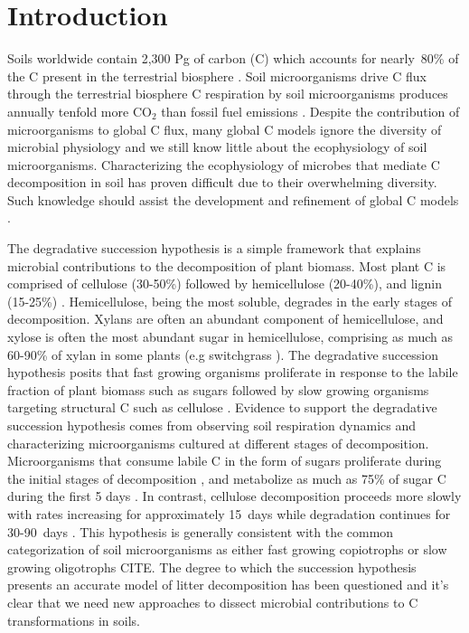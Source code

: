 \section{Introduction}
Soils worldwide contain 2,300 Pg of carbon (C) which accounts for nearly~80\%
of the C present in the terrestrial biosphere
\citep{Amundson_2001,BATJES_1996}. Soil microorganisms drive C flux through the
terrestrial biosphere C respiration by soil microorganisms
produces annually tenfold more CO$_{2}$ than fossil fuel emissions
\citep{chapin2002principles}. Despite the contribution of microorganisms to
global C flux, many global C models ignore the diversity of microbial
physiology \citep{Allison2010,Six2006,Treseder2011} and we still know little
about the ecophysiology of soil microorganisms. Characterizing the
ecophysiology of microbes that mediate C decomposition in soil has proven
difficult due to their overwhelming diversity. Such knowledge should assist
the development and refinement of global C models
\citep{Bradford2008,Neff_2001,McGuire2010,Wieder2013}.

The degradative succession hypothesis is a simple framework that explains
microbial contributions to the decomposition of plant biomass.  Most plant C is
comprised of cellulose (30-50\%) followed by hemicellulose
(20-40\%), and lignin (15-25\%) \citep{Lynd2002}. Hemicellulose, being the most
soluble, degrades in the early stages of decomposition. Xylans are often an
abundant component of hemicellulose, and xylose is often the most abundant
sugar in hemicellulose, comprising as much as 60-90\% of xylan in some plants
(e.g  switchgrass \citep{Bunnell2013}). The degradative succession hypothesis
posits that fast growing organisms proliferate in response to the labile
fraction of plant biomass such as sugars \citep{Garrett1963,Bremer1994}
followed by slow growing organisms targeting structural C such as cellulose
\citep{Garrett1963}. Evidence to support the degradative succession hypothesis
comes from observing soil respiration dynamics and characterizing
microorganisms cultured at different stages of decomposition.  Microorganisms
that consume labile C in the form of sugars proliferate during
the initial stages of decomposition \citep{Garrett1951,Alexander1964}, and
metabolize as much as 75\% of sugar C during the first 5 days
\citep{Engelking2007}. In contrast, cellulose decomposition proceeds more
slowly with rates increasing for approximately 15~days while degradation
continues for 30-90~days \citep{Hu1997,Engelking2007}. This hypothesis is
generally consistent with the common categorization of soil microorganisms as
either fast growing copiotrophs or slow growing oligotrophs CITE. The degree to
which the succession hypothesis presents an accurate model of litter
decomposition has been questioned
\citep{AnneliseHKjoller2002,Frankland_1998,Osono_2005} and it's clear that we
need new approaches to dissect microbial contributions to C transformations in
soils.


